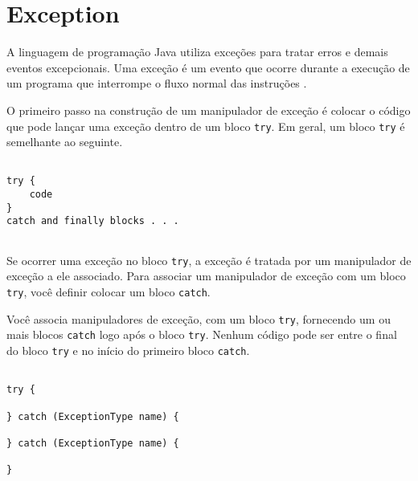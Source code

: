 \section{Exception}

A linguagem de programação Java utiliza exceções para tratar erros e
demais eventos excepcionais. Uma exceção é um evento que ocorre durante
a execução de um programa que interrompe o fluxo normal das instruções
\cite{except}.

O primeiro passo na construção de um manipulador de exceção é colocar
o código que pode lançar uma exceção dentro de um bloco \texttt{try}. Em geral,
um bloco \texttt{try} é semelhante ao seguinte.

\begin{lstlisting}

try {
    code
}
catch and finally blocks . . .
    
\end{lstlisting}


Se ocorrer uma exceção no bloco \texttt{try}, a exceção é tratada por um
manipulador de exceção a ele associado. Para associar um manipulador de
exceção com um bloco \texttt{try}, você definir colocar um bloco
\texttt{catch}.

Você associa manipuladores de exceção, com um bloco \texttt{try}, fornecendo
um ou mais blocos \texttt{catch} logo após o bloco \texttt{try}. Nenhum
código pode ser entre o final do bloco \texttt{try} e no início do primeiro bloco %
\texttt{catch}.

\begin{lstlisting}

try {
     
} catch (ExceptionType name) {
     
} catch (ExceptionType name) {
     
}  

\end{lstlisting}
